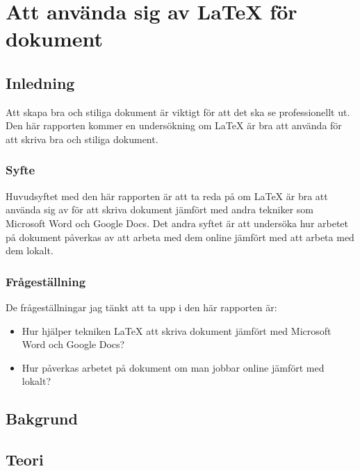 \chapter{Att använda sig av LaTeX för dokument}
\label{cha:indiv-report-tuhkala}

\section{Inledning}
\label{sec:introduction-tuhkala}
Att skapa bra och stiliga dokument är viktigt för att det ska se professionellt ut. Den här rapporten kommer en undersökning om LaTeX är bra att använda för att skriva bra och stiliga dokument.

\subsection{Syfte}
\label{sec:purpose-tuhkala}
Huvudsyftet med den här rapporten är att ta reda på om LaTeX är bra att använda sig av för att skriva dokument jämfört med andra tekniker som Microsoft Word och Google Docs. Det andra syftet är att undersöka hur arbetet på dokument påverkas av att arbeta med dem online jämfört med att arbeta med dem lokalt.

\subsection{Frågeställning}
\label{sec:issue-tuhkala}
De frågeställningar jag tänkt att ta upp i den här rapporten är:

\begin{itemize}
	\item Hur hjälper tekniken LaTeX att skriva dokument jämfört med Microsoft Word och Google Docs?
	\item Hur påverkas arbetet på dokument om man jobbar online jämfört med lokalt?
\end{itemize}

\section{Bakgrund}
\label{sec:background-tuhkala}


\section{Teori}
\label{sec:theory-tuhkala}

